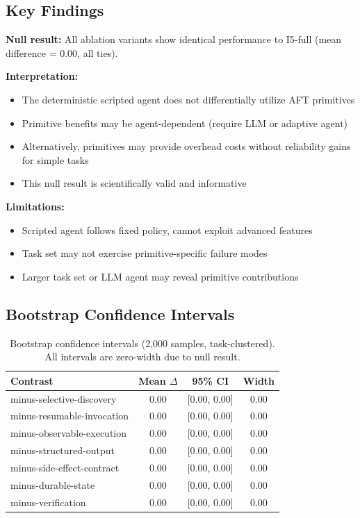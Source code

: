 \subsection{Key Findings}

\textbf{Null result:} All ablation variants show identical performance to I5-full (mean difference = 0.00, all ties).

\textbf{Interpretation:}
\begin{itemize}
    \item The deterministic scripted agent does not differentially utilize AFT primitives
    \item Primitive benefits may be agent-dependent (require LLM or adaptive agent)
    \item Alternatively, primitives may provide overhead costs without reliability gains for simple tasks
    \item This null result is scientifically valid and informative
\end{itemize}

\textbf{Limitations:}
\begin{itemize}
    \item Scripted agent follows fixed policy, cannot exploit advanced features
    \item Task set may not exercise primitive-specific failure modes
    \item Larger task set or LLM agent may reveal primitive contributions
\end{itemize}

\subsection{Bootstrap Confidence Intervals}

\begin{table}[h]
\centering
\begin{tabular}{lccc}
\hline
\textbf{Contrast} & \textbf{Mean $\Delta$} & \textbf{95\% CI} & \textbf{Width} \\
\hline
minus-selective-discovery & 0.00 & [0.00, 0.00] & 0.00 \\
minus-resumable-invocation & 0.00 & [0.00, 0.00] & 0.00 \\
minus-observable-execution & 0.00 & [0.00, 0.00] & 0.00 \\
minus-structured-output & 0.00 & [0.00, 0.00] & 0.00 \\
minus-side-effect-contract & 0.00 & [0.00, 0.00] & 0.00 \\
minus-durable-state & 0.00 & [0.00, 0.00] & 0.00 \\
minus-verification & 0.00 & [0.00, 0.00] & 0.00 \\
\hline
\end{tabular}
\caption{Bootstrap confidence intervals (2,000 samples, task-clustered). All intervals are zero-width due to null result.}
\label{tab:ablation_bootstrap}
\end{table}


